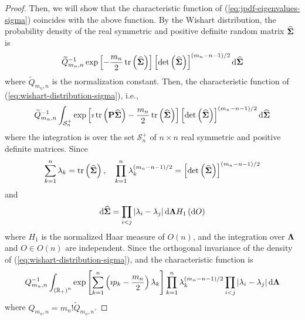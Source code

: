 \begin{proof}
	Then, we will show that the characteristic function of (\ref{eq:jpdf-eigenvalues-sigma}) coincides with the above function. By the Wishart distribution, the probability density of the real symmetric and positive definite random matrix \(\widehat{\boldsymbol{\Sigma}}\) is
	\begin{equation}
		\widetilde{Q}_{m_{n},n}^{-1}\exp\left[-\frac{m_{n}}{2}\operatorname{tr}\left(\widehat{\boldsymbol{\Sigma}}\right)\right]\left[\det\left(\widehat{\boldsymbol{\Sigma}}\right)\right]^{(m_{n}-n-1)/2}\mathop{}\!\mathrm{d}\widehat{\boldsymbol{\Sigma}}
		\label{eq:wishart-distribution-sigma}
	\end{equation}
	where \(\widetilde{Q}_{m_{n},n}\) is the normalization constant. Then, the characteristic function of (\ref{eq:wishart-distribution-sigma}), i.e.,
	\begin{equation*}
		\widetilde{Q}_{m_{n},n}^{-1}\int_{\mathcal{S}_{n}^{+}}\exp\left[\imath\operatorname{tr}\left(\mathbf{P}\widehat{\boldsymbol{\Sigma}}\right)-\frac{m_{n}}{2}\operatorname{tr}\left(\widehat{\boldsymbol{\Sigma}}\right)\right]\left[\det\left(\widehat{\boldsymbol{\Sigma}}\right)\right]^{(m_{n}-n-1)/2}\mathop{}\!\mathrm{d}\widehat{\boldsymbol{\Sigma}}
	\end{equation*}
	where the integration is over the set \(\mathcal{S}_{n}^{+}\) of \(n\times n\) real symmetric and positive definite matrices. Since
	\begin{equation*}
		\sum_{k=1}^{n}\lambda_{k}=\operatorname{tr}\left(\widehat{\boldsymbol{\Sigma}}\right),\quad\prod_{k=1}^{n}\lambda_{k}^{(m_{n}-n-1)/2}=\left[\det\left(\widehat{\boldsymbol{\Sigma}}\right)\right]^{(m_{n}-n-1)/2}
	\end{equation*}
	and
	\begin{equation*}
		\mathop{}\!\mathrm{d}\widehat{\boldsymbol{\Sigma}}=\prod_{i<j}\left|\lambda_{i}-\lambda_{j}\right|\mathop{}\!\mathrm{d}\boldsymbol{\Lambda} H_{1}\left(\mathop{}\!\mathrm{d} O\right)
	\end{equation*}
	where \(H_{1}\) is the normalized Haar measure of \(O(n)\), and the integration over \(\boldsymbol{\Lambda}\) and \(O\in O(n)\) are independent. Since the orthogonal invariance of the density of (\ref{eq:wishart-distribution-sigma}), and the characteristic function is
	\begin{equation}
		Q_{m_{n},n}^{-1}\int_{\left(\mathbb{R}_{+}\right)^{n}}\exp\left[\sum_{k=1}^{n}\left(\imath p_{k}-\frac{m_{n}}{2}\right)\lambda_{k}\right]\prod_{k=1}^{n}\lambda_{k}^{(m_{n}-n-1)/2}\prod_{i<j}\left|\lambda_{i}-\lambda_{j}\right|\mathop{}\!\mathrm{d}\boldsymbol{\Lambda}
		\label{eq:characteristic-function-wishart}
	\end{equation}
	where \(Q_{m_{n},n}=m_{n}!\widetilde{Q}_{m_{n},n}\).


\end{proof}
